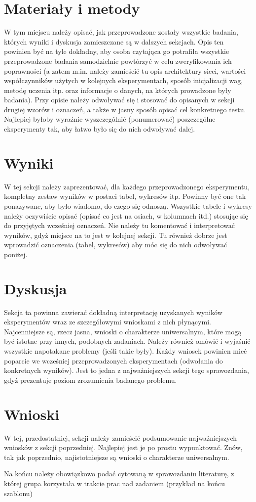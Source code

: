 \documentclass{classrep}
\begin{document}
\section{Materiały i metody}
{\color{blue}
W tym miejscu należy opisać, jak przeprowadzone zostały wszystkie badania,
których wyniki i dyskusja zamieszczane są w dalszych sekcjach. Opis ten
powinien być na tyle dokładny, aby osoba czytająca go potrafiła wszystkie
przeprowadzone badania samodzielnie powtórzyć w celu zweryfikowania ich
poprawności (a zatem m.in. należy zamieścić tu opis architektury sieci,
wartości współczynników użytych w kolejnych eksperymentach, sposób
inicjalizacji wag, metodę uczenia itp. oraz informacje o danych, na których
prowadzone były badania). Przy opisie należy odwoływać się i stosować do
opisanych w sekcji drugiej wzorów i oznaczeń, a także w jasny sposób opisać
cel konkretnego testu. Najlepiej byłoby wyraźnie wyszczególnić (ponumerować)
poszczególne eksperymenty tak, aby łatwo było się do nich odwoływać dalej.}

\section{Wyniki}
{\color{blue}
W tej sekcji należy zaprezentować, dla każdego przeprowadzonego eksperymentu,
kompletny zestaw wyników w postaci tabel, wykresów itp. Powinny być one tak
ponazywane, aby było wiadomo, do czego się odnoszą. Wszystkie tabele i wykresy
należy oczywiście opisać (opisać co jest na osiach, w kolumnach itd.) stosując
się do przyjętych wcześniej oznaczeń. Nie należy tu komentować i interpretować
wyników, gdyż miejsce na to jest w kolejnej sekcji. Tu również dobrze jest
wprowadzić oznaczenia (tabel, wykresów) aby móc się do nich odwoływać
poniżej.}

\section{Dyskusja}
{\color{blue}
Sekcja ta powinna zawierać dokładną interpretację uzyskanych wyników
eksperymentów wraz ze szczegółowymi wnioskami z nich płynącymi. Najcenniejsze
są, rzecz jasna, wnioski o charakterze uniwersalnym, które mogą być istotne
przy innych, podobnych zadaniach. Należy również omówić i wyjaśnić wszystkie
napotakane problemy (jeśli takie były). Każdy wniosek powinien mieć poparcie
we wcześniej przeprowadzonych eksperymentach (odwołania do konkretnych
wyników). Jest to jedna z najważniejszych sekcji tego sprawozdania, gdyż
prezentuje poziom zrozumienia badanego problemu.}
\section{Wnioski}
{\color{blue}W tej, przedostatniej, sekcji należy zamieścić podsumowanie
najważniejszych wniosków z sekcji poprzedniej. Najlepiej jest je po prostu
wypunktować. Znów, tak jak poprzednio, najistotniejsze są wnioski o
charakterze uniwersalnym.}


\begin{thebibliography}{0}
\end{thebibliography}
{\color{blue} 
Na końcu należy obowiązkowo podać cytowaną w sprawozdaniu
literaturę, z której grupa korzystała w trakcie prac nad zadaniem (przykład na
końcu szablonu)}
\end{document}
